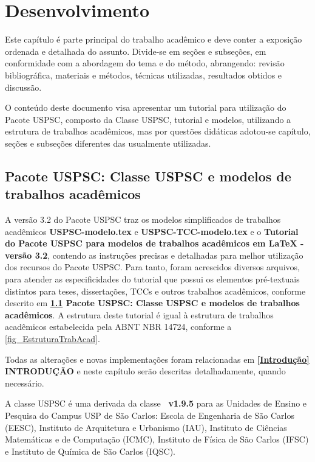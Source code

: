 

\chapter{Desenvolvimento}\label{cap_exemplos}
Este capítulo é parte principal do trabalho acadêmico e deve conter a exposição ordenada e detalhada do assunto. Divide-se em seções e subseções, em conformidade com a abordagem do tema e do método, abrangendo: revisão bibliográfica, materiais e métodos, técnicas utilizadas, resultados obtidos e discussão.

O conteúdo deste documento visa apresentar um tutorial para utilização do Pacote USPSC, composto da Classe USPSC, tutorial e modelos, utilizando a estrutura de trabalhos acadêmicos, mas por questões didáticas adotou-se capítulo, seções e subseções diferentes das usualmente utilizadas.


\section{Pacote USPSC: Classe USPSC e modelos de trabalhos acadêmicos}\label{Pacote}
A versão 3.2 do Pacote USPSC traz os modelos simplificados de trabalhos acadêmicos \textbf{USPSC-modelo.tex} e \textbf{USPSC-TCC-modelo.tex} e o \textbf{Tutorial do Pacote USPSC para modelos de trabalhos acad\^emicos em LaTeX - vers\~ao 3.2}, contendo as instruções precisas e detalhadas para melhor utilização dos recursos do Pacote USPSC. Para tanto, foram acrescidos diversos arquivos, para atender as especificidades do tutorial que possui os elementos pré-textuais distintos para teses, dissertações, TCCs e outros trabalhos acadêmicos, conforme descrito em  \textbf{\ref{Pacote} Pacote USPSC: Classe USPSC e modelos de trabalhos acadêmicos}. A estrutura deste tutorial é igual à estrutura de trabalhos acadêmicos estabelecida pela ABNT NBR 14724, conforme a \autoref{fig_EstruturaTrabAcad}.

Todas as alterações e novas implementações foram relacionadas em \textbf{\ref{Introdução} INTRODUÇÃO} e neste capítulo serão descritas detalhadamente, quando necessário. 

A classe USPSC é uma derivada da classe \textbf{\abnTeX\ v1.9.5} para as Unidades de Ensino e Pesquisa do Campus USP de São Carlos:
Escola de Engenharia de São Carlos (EESC), Instituto de Arquitetura e Urbanismo (IAU), Instituto de Ciências Matemáticas e de Computação (ICMC), Instituto de Física de São Carlos (IFSC) e Instituto de Química de São Carlos (IQSC).

